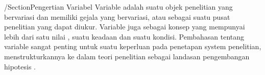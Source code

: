 










/Section{Pengertian Variabel}
Variable adalah suatu objek penelitian yang bervariasi dan memiliki gejala yang 
bervariasi, atau sebagai suatu pusat penelitian yang dapat diukur. Variable juga 
sebagai konsep yang mempunyai  lebih dari satu nilai , suatu keadaan dan suatu kondisi.
Pembahasan tentang variable sangat  penting  untuk suatu keperluan pada penetapan system
penelitian, menstrukturkannya ke dalam teori penelitian sebagai landasan pengembangan 
hipotesis .  
